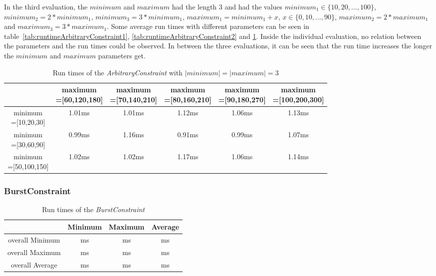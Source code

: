 In the third evaluation, the $minimum$ and $maximum$ had the length 3 and had the values $minimum_1\in\{10, 20, ..., 100\}$, $minimum_2=2*minimum_1$, $minimum_3=3*minimum_1$, $maximum_1=minimum_1+x$, $x\in\{0, 10, ..., 90\}$, $maximum_2=2*maximum_1$ and $maximum_3=3*maximum_1$. Some average run times with different parameters can be seen in table~\ref{tab:runtimeArbitraryConstraint1}, \ref{tab:runtimeArbitraryConstraint2} and \ref{tab:runtimeArbitraryConstraint3}. Inside the individual evaluation, no relation between the parameters and the run times could be observed. In between the three evaluations, it can be seen that the run time increases the longer the $minimum$ and $maximum$ parameters get.
\begin{table}
	\begin{tabular}{|c|c|c|c|c|c|}
		\hline
					&\makecell{maximum\\=[60,120,180]} & \makecell{maximum\\=[70,140,210]} &  \makecell{maximum\\=[80,160,210]} &  \makecell{maximum\\=[90,180,270]} &  \makecell{maximum\\=[100,200,300]}\\
		\hline
		\makecell{minimum\\=[10,20,30]} & 1.01ms & 1.01ms & 1.12ms & 1.06ms & 1.13ms\\
		\hline
		\makecell{minimum\\=[30,60,90]} & 0.99ms & 1.16ms & 0.91ms & 0.99ms & 1.07ms\\
		\hline
		\makecell{minimum\\=[50,100,150]} & 1.02ms & 1.02ms & 1.17ms & 1.06ms & 1.14ms\\
		\hline
	\end{tabular}
	\centering
	\caption{Run times of the \textit{ArbitraryConstraint} with $|minimum|=|maximum|=3$}
	\label{tab:runtimeArbitraryConstraint3}
\end{table}

\subsubsection{BurstConstraint}
\begin{table}
	\begin{tabular}{|c|c|c|c|}
		\hline
		& Minimum &  Maximum &  Average \\
		\hline
		overall Minimum & ms & ms & ms\\
		\hline
		overall Maximum & ms & ms & ms\\
		\hline
		overall Average & ms & ms & ms\\
		\hline
	\end{tabular}
	\centering
	\caption{Run times of the \textit{BurstConstraint}}
	\label{tab:runtimeBurstConstraint}
\end{table}

